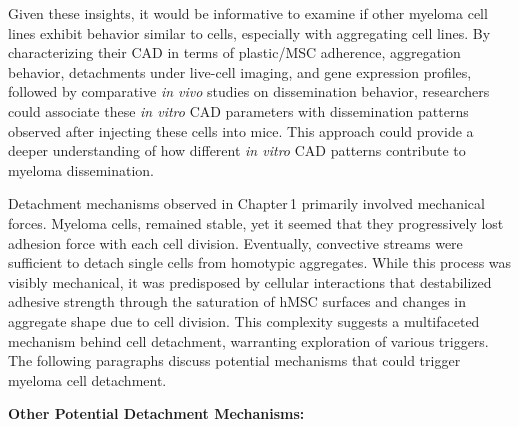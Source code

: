 Given these insights, it would be informative to examine if other myeloma cell
lines exhibit behavior similar to \INA cells, especially with aggregating cell
lines. By characterizing their \ac{CAD} in terms of plastic/MSC adherence,
aggregation behavior, detachments under live-cell imaging, and gene expression
profiles, followed by comparative \textit{in vivo} studies on dissemination
behavior, researchers could associate these \textit{in vitro} \ac{CAD}
parameters with dissemination patterns observed after injecting these cells into
mice. This approach could provide a deeper understanding of how
different \textit{in vitro} \ac{CAD} patterns contribute to myeloma dissemination.



\unnsubsection{\caddtriggertitle}%
\label{sec:discussion_caddtrigger}%
Detachment mechanisms observed in Chapter\,1 primarily involved mechanical
forces. Myeloma cells,  remained stable,
yet it seemed that they progressively lost adhesion force with each cell
division. Eventually, convective streams were sufficient to detach single \INA
cells from homotypic aggregates. While this process was visibly mechanical, it
was predisposed by cellular interactions that destabilized adhesive strength
through the saturation of hMSC surfaces and changes in aggregate shape due to
cell division. This complexity suggests a multifaceted mechanism behind cell
detachment, warranting exploration of various triggers. The following paragraphs
discuss potential mechanisms that could trigger myeloma cell detachment.

\noindent\textbf{Other Potential Detachment Mechanisms:}%

